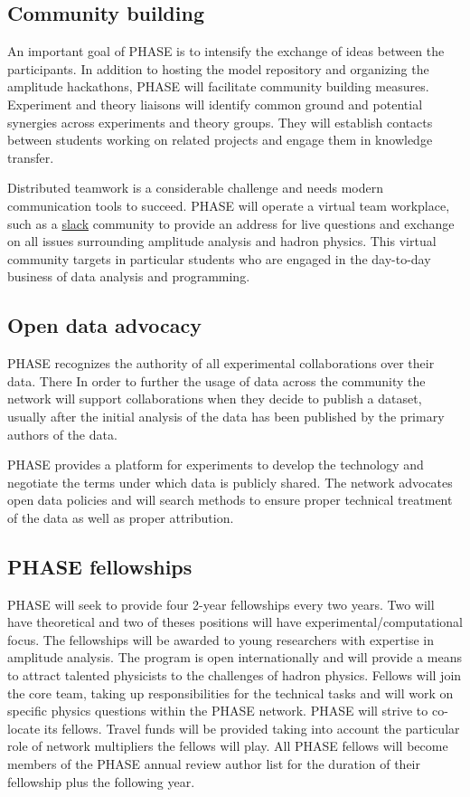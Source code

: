 \subsection{Community building}
\label{sec:community}
An important goal of PHASE is to intensify the exchange of ideas between the participants. In addition to hosting the model repository and organizing the amplitude hackathons, PHASE will facilitate community building measures. Experiment and theory liaisons will identify common ground and potential synergies across experiments and theory groups. They will establish contacts between students working on related projects and engage them in knowledge transfer.

Distributed teamwork is a considerable challenge and needs modern communication tools to succeed. PHASE will operate a virtual team workplace, such as a \href{http://slack.com}{slack} community to provide an address for live questions and exchange on all issues surrounding amplitude analysis and hadron physics. This virtual community targets in particular students who are engaged in the day-to-day business of data analysis and programming.

\subsection{Open data advocacy}
\label{sec:opendata}
PHASE recognizes the authority of all experimental collaborations over their data. There In order to further the usage of data across the community the network will support collaborations when they decide to publish a dataset, usually after the initial analysis of the data has been published by the primary authors of the data. 

PHASE provides a platform for experiments to develop the technology and negotiate the terms under which data is publicly shared. The network advocates open data policies and will search methods to ensure proper technical treatment of the data as well as proper attribution.


\subsection{PHASE fellowships}
\label{sec:fellowships}
PHASE will seek to provide four 2-year fellowships every two years. Two will have theoretical and two of theses positions will have experimental/computational focus. The fellowships will be awarded to young researchers with expertise in amplitude analysis. The program is open internationally and will provide a means to attract talented physicists to the challenges of hadron physics. Fellows will join the core team, taking up responsibilities for the technical tasks and will work on specific physics questions within the PHASE network. PHASE will strive to co-locate its fellows. Travel funds will be provided taking into account the particular role of network multipliers the fellows will play. All PHASE fellows will become members of the PHASE annual review author list for the duration of their fellowship plus the following year.     
